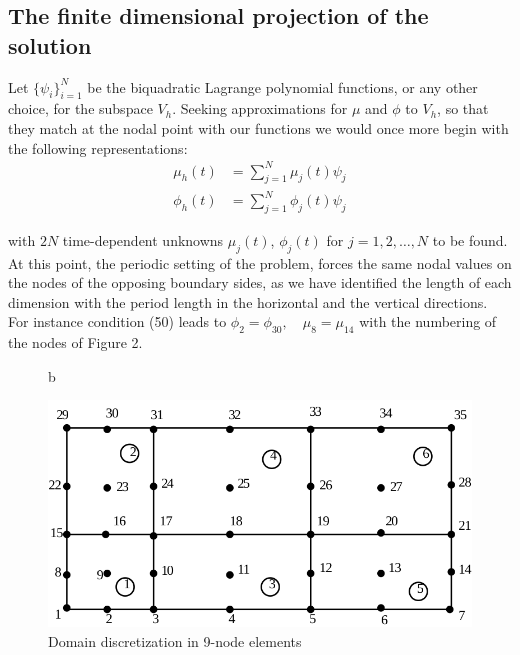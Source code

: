 \documentclass{article}
\begin{document}
\subsection{The finite dimensional projection of the solution}

Let $\{\psi_i\}_{i=1}^N$ be the biquadratic Lagrange polynomial functions, or any other choice, for the subspace $V_h$. Seeking approximations for $\mu$ and $\phi$ to $V_h$, so that they match at the nodal point with our functions we would once more begin with the following representations:\\

\begin{align}
\mu_{h}(t) &= \sum_{j=1}^N \mu_{j}(t) \psi_j \\
\phi_h(t) &= \sum_{j=1}^N \phi_j(t) \psi_j
\end{align}

with $2N$ time-dependent unknowns $\mu_j(t)$, $\phi_j(t)$ for $j = 1, 2, \ldots, N$ to be found.\\


At this point, the periodic setting of the problem, forces the same nodal values on the nodes of the opposing boundary sides, as we have identified the length of each dimension with the period length in the horizontal and the vertical directions.\\

For instance condition (50) leads to $\phi_{2} = \phi_{30},\quad \mu_{8} = \mu_{14}$ with the numbering of the nodes of Figure 2.

\begin{figure}{b}
\begin{center}
\includegraphics[scale=0.4]{rectangledomain2.png}
\caption{Domain discretization in 9-node elements}\label{Figure2}
\end{center}
\end{figure}
\end{document}
